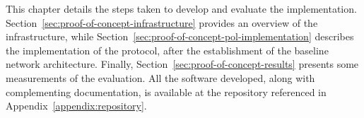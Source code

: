 This chapter details the steps taken to develop and evaluate the \poc{} implementation. Section~\ref{sec:proof-of-concept-infrastructure} provides an overview of the infrastructure, while Section~\ref{sec:proof-of-concept-pol-implementation} describes the implementation of the \pol{} protocol, after the establishment of the baseline network architecture. Finally, Section~\ref{sec:proof-of-concept-results} presents some measurements of the \poc{} evaluation. All the software developed, along with complementing documentation, is available at the repository referenced in Appendix~\ref{appendix:repository}.
